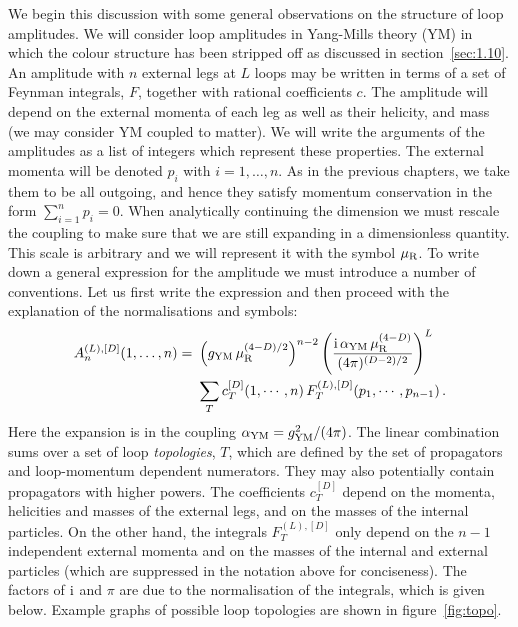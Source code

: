 We begin this discussion with some general observations on the structure of
loop amplitudes. We will consider loop amplitudes in Yang-Mills theory (YM) in
which the colour structure has been stripped off as discussed in
section~\ref{sec:1.10}.  An amplitude with $n$ external legs at $L$ loops may
be written in terms of a set of Feynman integrals, $F$, together with rational
coefficients $c$. The amplitude will depend on the external momenta of each leg
as well as their helicity, and mass (we may consider YM coupled to matter). We
will write the arguments of the amplitudes as a list of integers which
represent these properties.  The external momenta will be denoted $p_i$ with $i
= 1,\ldots,n$.  As in the previous chapters, we take them to be all outgoing,
and hence they satisfy momentum conservation in the form $\sum_{i=1}^n p_i =
0$. When analytically continuing the dimension we must rescale the coupling to
make sure that we are still expanding in a dimensionless quantity. This scale
is arbitrary and we will represent it with the symbol $\mu_{\rm R}$. To write
down a general expression for the amplitude we must introduce a number of
conventions. Let us first write the expression and then proceed with the
explanation of the normalisations and symbols:
\begin{align} \begin{aligned}
  A_n^{(L),[D]}(1,\ldots,n) = \ &
    \left(g_{\rm YM} \,\mu_{\rm R}^{(4-D)/2}\right)^{n-2}
    \left(\frac{\mathrm{i} \, \alpha_{\rm YM}\,\mu_{\rm R}^{(4-D)}}{(4\pi)^{(D-2)/2}}\right)^L \\&
  \sum_T c_T^{[D]} (1,\cdots,n) \, F_{T}^{(L),[D]}(p_1,\cdots,p_{n-1}) \,.
  \end{aligned}
  \label{eq:loopamp-general}
\end{align}
Here the expansion is in the coupling $\alpha_{\rm YM} = g_{\rm YM}^2/(4\pi)$.
The linear combination sums over a set of loop \textit{topologies}, $T$, which
are defined by the set of propagators and loop-momentum dependent numerators.
They may also potentially contain propagators with higher powers. The
coefficients $c_T^{[D]}$ depend on the momenta, helicities and masses of the
external legs, and on the masses of the internal particles. On the other hand, the
integrals $F_{T}^{(L),[D]}$ only depend on the $n-1$ independent external
momenta and on the masses of the internal and external particles (which are
suppressed in the notation above for conciseness).  The factors of $\mathrm{i}$ and
$\pi$ are due to the normalisation of the integrals, which is given below.
Example graphs of possible loop topologies are shown in figure~\ref{fig:topo}.

